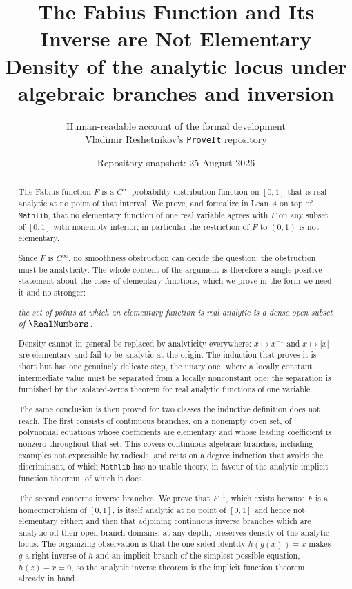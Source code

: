 \documentclass[11pt,oneside]{article}
\title{\bfseries The Fabius Function and Its Inverse are Not Elementary\\[0.35em]
\large Density of the analytic locus under algebraic branches and inversion}
\author{Human-readable account of the formal development\\
\small Vladimir Reshetnikov's \texttt{ProveIt} repository}
\date{Repository snapshot: 25 August 2026}
\theoremstyle{definition}
\theoremstyle{remark}
\begin{document}
\maketitle

\begin{abstract}
The Fabius function $F$ is a $C^\infty$ probability distribution function on
$[0,1]$ that is real analytic at no point of that interval.  We prove, and
formalize in Lean~4 on top of \texttt{Mathlib}, that no elementary function of
one real variable agrees with $F$ on any subset of $[0,1]$ with nonempty
interior; in particular the restriction of $F$ to $(0,1)$ is not elementary.

Since $F$ is $C^\infty$, no smoothness obstruction can decide the question:
the obstruction must be analyticity.  The whole content of the argument is
therefore a single positive statement about the class of elementary functions,
which we prove in the form we need it and no stronger:

\begin{center}
\emph{the set of points at which an elementary function is real analytic is a
dense open subset of $\RealNumbers$.}
\end{center}

Density cannot in general be replaced by analyticity everywhere:
$x\mapsto x^{-1}$ and $x\mapsto |x|$ are elementary and fail to be analytic at
the origin.  The
induction that proves it is short but has one genuinely delicate step, the
unary one, where a locally constant intermediate value must be separated from
a locally nonconstant one; the separation is furnished by the isolated-zeros
theorem for real analytic functions of one variable.

The same conclusion is then proved for two classes the inductive definition
does not reach.  The first consists of continuous branches, on a nonempty open
set, of polynomial equations whose coefficients are elementary and whose
leading coefficient is nonzero throughout that set.  This covers continuous
algebraic branches, including examples not expressible by radicals, and rests
on a degree induction that avoids the discriminant, of which
\texttt{Mathlib} has no usable theory, in favour of the analytic implicit
function theorem, of which it does.

The second concerns inverse branches.  We prove that $F^{-1}$, which exists
because $F$ is a homeomorphism of $[0,1]$, is itself analytic at no point of
$[0,1]$ and hence not elementary either; and then that adjoining continuous
inverse branches which are analytic off their open branch domains, at any
depth, preserves density of the analytic locus.  The organizing observation
is that the one-sided identity $h(g(x))=x$ makes $g$ a right inverse of $h$
and an implicit branch of the simplest possible equation, $h(z)-x=0$, so the
analytic inverse theorem is the implicit function theorem already in hand.
\end{abstract}
\end{document}
